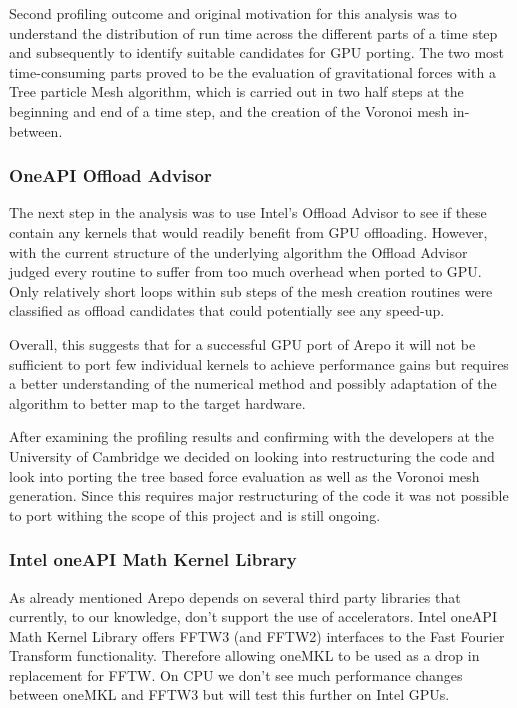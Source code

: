\documentclass[../main]{subfiles}
\begin{document}
Second profiling outcome and original motivation for this analysis was to understand the distribution of run time across the different parts of a time step and subsequently to identify suitable candidates for GPU porting.
The two most time-consuming parts proved to be the evaluation of gravitational forces with a Tree particle Mesh algorithm, which is carried out in two half steps at the beginning and end of a time step, and the creation of the Voronoi mesh in-between. 

 \subsubsection{OneAPI Offload Advisor}
The next step in the analysis was to use Intel's Offload Advisor to see if these contain any kernels that would readily benefit from GPU offloading.
However, with the current structure of the underlying algorithm the Offload Advisor judged every routine to suffer from too much overhead when ported to GPU.
Only relatively short loops within sub steps of the mesh creation routines were classified as offload candidates that could potentially see any speed-up.

Overall, this suggests that for a successful GPU port of Arepo it will not be sufficient to port few individual kernels to achieve performance gains but requires a better understanding of the numerical method and possibly adaptation of the algorithm to better map to the target hardware. 

After examining the profiling results and confirming with the developers at the University of Cambridge we decided on looking into restructuring the code and look into porting the tree based force evaluation as well as the Voronoi mesh generation. Since this requires major restructuring of the code it was not possible to port withing the scope of this project and is still ongoing. 

\subsubsection{Intel oneAPI Math Kernel Library}
As already mentioned Arepo depends on several third party libraries that currently, to our knowledge, don't support the use of accelerators. Intel oneAPI Math Kernel Library offers FFTW3 (and FFTW2) interfaces to the Fast Fourier Transform functionality. Therefore allowing oneMKL to be used as a drop in replacement for FFTW. On CPU we don't see much performance changes between oneMKL and FFTW3 but will test this further on Intel GPUs. 
\end{document}
